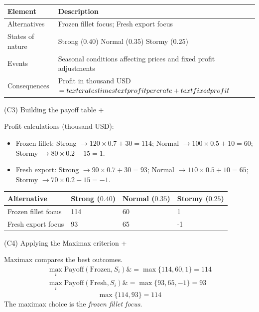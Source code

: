 \documentclass[11pt]{article}
\begin{document}
	
	\begin{center}
		\begin{tabular}{ll}
			\toprule
			Element & Description \\
			\midrule
			Alternatives & Frozen fillet focus; Fresh export focus \\
			States of nature & Strong
			($0.40$)
			Normal
			($0.35$)
			Stormy
			($0.25$) \\
			Events & Seasonal conditions affecting prices and fixed profit adjustments \\
			Consequences & Profit in thousand USD $= \\text{crates} \\times \\text{profit per crate} + \\text{fixed profit}$ \\
			\bottomrule
		\end{tabular}
	\end{center}
	
	
	
	
	
	
	(C3) Building the payoff table
	+
	
	
	Profit calculations (thousand USD):
	\begin{itemize}
		\item Frozen fillet: Strong $\to 120 \times 0.7 + 30 = 114$; Normal $\to 100 \times 0.5 + 10 = 60$; Stormy $\to 80 \times 0.2 - 15 = 1$.
		\item Fresh export: Strong $\to 90 \times 0.7 + 30 = 93$; Normal $\to 110 \times 0.5 + 10 = 65$; Stormy $\to 70 \times 0.2 - 15 = -1$.
	\end{itemize}
	
	\begin{center}
		\begin{tabular}{llll}
			\toprule
			Alternative & Strong
			($0.40$) & Normal
			($0.35$) & Stormy
			($0.25$) \\
			\midrule
			Frozen fillet focus & 114 & 60 & 1 \\
			Fresh export focus & 93 & 65 & -1 \\
			\bottomrule
		\end{tabular}
	\end{center}
	
	
	
	
	
	
	(C4) Applying the Maximax criterion
	+
	
	
	Maximax compares the best outcomes.
	\[
	\begin{aligned}
		\max_i \text{Payoff}(\text{Frozen}, S_i) \&= \max\{114, 60, 1\} = 114 \\
		\max_i \text{Payoff}(\text{Fresh}, S_i) \&= \max\{93, 65, -1\} = 93
	\end{aligned}
	\]
	\[
	\max\{114, 93\} = 114
	\]
	The maximax choice is the \emph{frozen fillet focus}.
	
\end{document}
